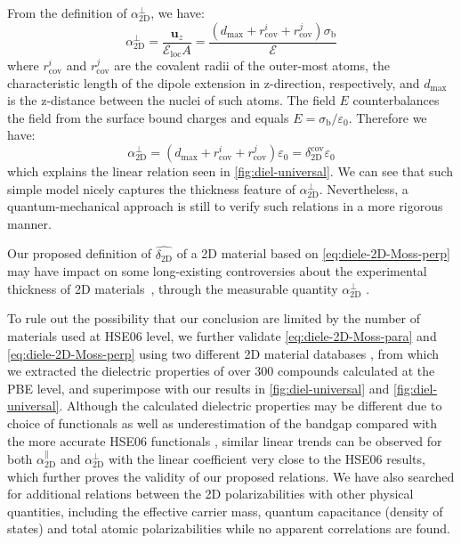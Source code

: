 From the definition of
$\alpha_{\mathrm{2D}}^{\perp}$, we have:
\begin{equation}
  \label{eq:alpha-classic}
  \alpha_{\mathrm{2D}}^{\perp} = \frac{\boldsymbol{u}_{z}}{\mathcal{E}_{\mathrm{loc}} A}
  = \frac{(d_{\mathrm{max}} + r_{\mathrm{cov}}^{i} + r_{\mathrm{cov}}^{j}) \sigma_{\mathrm{b}}}{\mathscr{E}}
\end{equation}
where $r_{\mathrm{cov}}^{i}$ and $r_{\mathrm{cov}}^{j}$ are the
covalent radii of the outer-most atoms, the characteristic length of
the dipole extension in z-direction, respectively, and $d_{\mathrm{max}}$ is the
z-distance between the nuclei of such atoms.  The field $E$
counterbalances the field from the surface bound charges and equals
$E = \sigma_{\mathrm{b}}/\varepsilon_{0}$. Therefore we have:
\begin{equation}
  \label{eq:alpha-classic-2}
  \alpha_{\mathrm{2D}}^{\perp} = (d_{\mathrm{max}} + r_{\mathrm{cov}}^{i} + r_{\mathrm{cov}}^{j})\varepsilon_{0}
                = \delta_{\mathrm{2D}}^{\mathrm{cov}} \varepsilon_{0}
\end{equation}
which explains the linear relation seen in
\ref{fig:diel-universal}. We can see that such simple model
nicely captures the thickness feature of
$\alpha_{\mathrm{2D}}^{\perp}$. Nevertheless, a quantum-mechanical
approach is still to verify such relations in a more rigorous manner.


Our proposed definition of
$\hat{\delta_{\mathrm{2D}}}$ of a 2D material based on
\autoref{eq:diele-2D-Moss-perp} may have impact on some long-existing
controversies about the experimental thickness of 2D
materials~\cite{Shearer_2016}, through the measurable quantity
$\alpha_{\mathrm{2D}}^{\perp}$
\cite{Antoine_1999_polariz_C60,Cherniavskaya_2003_nanocryst_polariz,Krauss_1999_EFM}.
% 
%

To rule out the possibility that our conclusion are limited by the
number of materials used at HSE06 level, we further validate
\autoref{eq:diele-2D-Moss-para} and \autoref{eq:diele-2D-Moss-perp}
using two different 2D material databases
\cite{Haastrup_2018_database,Mounet_2018_database}, from which we
extracted the dielectric properties of over 300 compounds calculated
at the PBE level, and superimpose with our results in
\autoref{fig:diel-universal} and
\autoref{fig:diel-universal}. Although the calculated dielectric
properties may be different due to choice of functionals as well as
underestimation of the bandgap compared with the more accurate HSE06
functionals \cite{Van_Dyck_2017}, similar linear trends can be
observed for both $\alpha^{\parallel}_{\mathrm{2D}}$ and
$\alpha_{\mathrm{2D}}^{\perp}$ with the linear coefficient very close
to the HSE06 results, which further proves the validity of our
proposed relations. We have also searched for additional relations
between the 2D polarizabilities with other physical quantities,
including the effective carrier mass, quantum capacitance (density of
states) and total atomic polarizabilities while no apparent
correlations are found.

